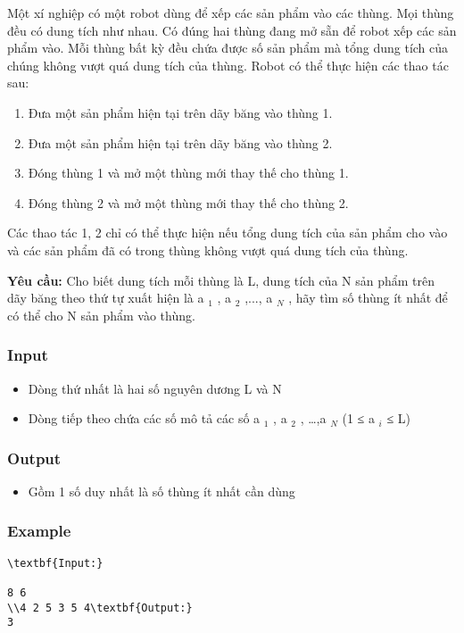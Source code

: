 



   Một xí nghiệp có một robot dùng để xếp các sản phẩm vào các thùng. Mọi thùng đều có dung tích như nhau. Có đúng hai thùng đang mở sẵn để robot xếp các sản phẩm vào. Mỗi thùng bất kỳ đều chứa được số sản phẩm mà tổng dung tích của chúng không vượt quá dung tích của thùng. Robot có thể thực hiện các thao tác sau:  
\begin{enumerate}
	\item     Đưa một sản phẩm hiện tại trên dãy băng vào thùng 1.   
	\item     Đưa một sản phẩm hiện tại trên dãy băng vào thùng 2.   
	\item     Đóng thùng 1 và mở một thùng mới thay thế cho thùng 1.   
	\item     Đóng thùng 2 và mở một thùng mới thay thế cho thùng 2.   
\end{enumerate}

   Các thao tác 1, 2 chỉ có thể thực hiện nếu tổng dung tích của sản phẩm cho vào và các sản phẩm đã có trong thùng không vượt quá dung tích của thùng.  



\textbf{    Yêu cầu:   }   Cho biết dung tích mỗi thùng là L, dung tích của N sản phẩm trên dãy băng theo thứ tự xuất hiện là a   $_    1   $   , a   $_    2   $   ,..., a   $_    N   $   , hãy tìm số thùng ít nhất để có thể cho N sản phẩm vào thùng.  

\subsubsection{   Input  }
\begin{itemize}
	\item     Dòng thứ nhất là hai số nguyên dương L và N   
	\item     Dòng tiếp theo chứa các số mô tả các số a    $_     1    $    , a    $_     2    $    , …,a    $_     N    $    (1 ≤ a    $_     i    $    ≤ L)   
\end{itemize}

\subsubsection{   Output  }
\begin{itemize}
	\item     Gồm 1 số duy nhất là số thùng ít nhất cần dùng   
\end{itemize}

\subsubsection{   Example  }
\begin{verbatim}
\textbf{Input:}

8 6
\\4 2 5 3 5 4\textbf{Output:}
3\end{verbatim}

